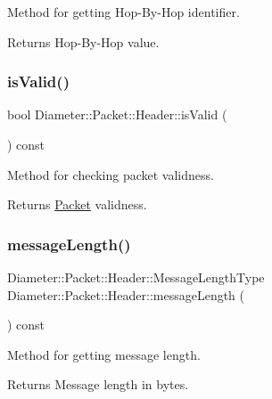 Method for getting Hop-\/\+By-\/\+Hop identifier. 

\begin{DoxyReturn}{Returns}
Hop-\/\+By-\/\+Hop value. 
\end{DoxyReturn}
\mbox{\label{classDiameter_1_1Packet_1_1Header_acddf8e84f63f81e44b3b7f0108e7528c}} 
\subsubsection{\texorpdfstring{is\+Valid()}{isValid()}}
{\footnotesize\ttfamily bool Diameter\+::\+Packet\+::\+Header\+::is\+Valid (\begin{DoxyParamCaption}{ }\end{DoxyParamCaption}) const}



Method for checking packet validness. 

\begin{DoxyReturn}{Returns}
\hyperlink{classDiameter_1_1Packet}{Packet} validness. 
\end{DoxyReturn}
\mbox{\label{classDiameter_1_1Packet_1_1Header_a0f15bcdf82cbb4adeb9570d83096249f}} 
\subsubsection{\texorpdfstring{message\+Length()}{messageLength()}\hspace{0.1cm}{\footnotesize\ttfamily [1/2]}}
{\footnotesize\ttfamily Diameter\+::\+Packet\+::\+Header\+::\+Message\+Length\+Type Diameter\+::\+Packet\+::\+Header\+::message\+Length (\begin{DoxyParamCaption}{ }\end{DoxyParamCaption}) const}



Method for getting message length. 

\begin{DoxyReturn}{Returns}
Message length in bytes. 
\end{DoxyReturn}
\mbox{\label{classDiameter_1_1Packet_1_1Header_a8dc2638edf5d090396a73fd34782e3ff}} 
